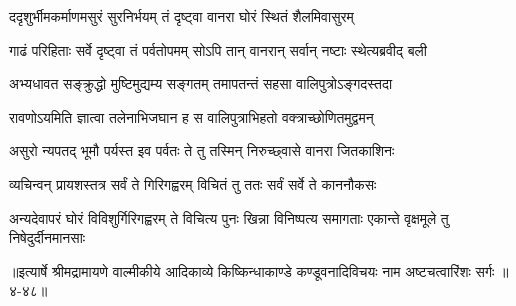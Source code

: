 \twolineshloka
{ददृशुर्भीमकर्माणमसुरं सुरनिर्भयम्}
{तं दृष्ट्वा वानरा घोरं स्थितं शैलमिवासुरम्} %

\twolineshloka
{गाढं परिहिताः सर्वे दृष्ट्वा तं पर्वतोपमम्}
{सोऽपि तान् वानरान् सर्वान् नष्टाः स्थेत्यब्रवीद् बली} %

\twolineshloka
{अभ्यधावत सङ्क्रुद्धो मुष्टिमुद्यम्य सङ्गतम्}
{तमापतन्तं सहसा वालिपुत्रोऽङ्गदस्तदा} %

\twolineshloka
{रावणोऽयमिति ज्ञात्वा तलेनाभिजघान ह}
{स वालिपुत्राभिहतो वक्त्राच्छोणितमुद्वमन्} %

\twolineshloka
{असुरो न्यपतद् भूमौ पर्यस्त इव पर्वतः}
{ते तु तस्मिन् निरुच्छ्वासे वानरा जितकाशिनः} %

\twolineshloka
{व्यचिन्वन् प्रायशस्तत्र सर्वं ते गिरिगह्वरम्}
{विचितं तु ततः सर्वं सर्वे ते काननौकसः} %

\threelineshloka
{अन्यदेवापरं घोरं विविशुर्गिरिगह्वरम्}
{ते विचित्य पुनः खिन्ना विनिष्पत्य समागताः}
{एकान्ते वृक्षमूले तु निषेदुर्दीनमानसाः} %


॥इत्यार्षे श्रीमद्रामायणे वाल्मीकीये आदिकाव्ये किष्किन्धाकाण्डे कण्डूवनादिविचयः नाम अष्टचत्वारिंशः सर्गः ॥४-४८॥
